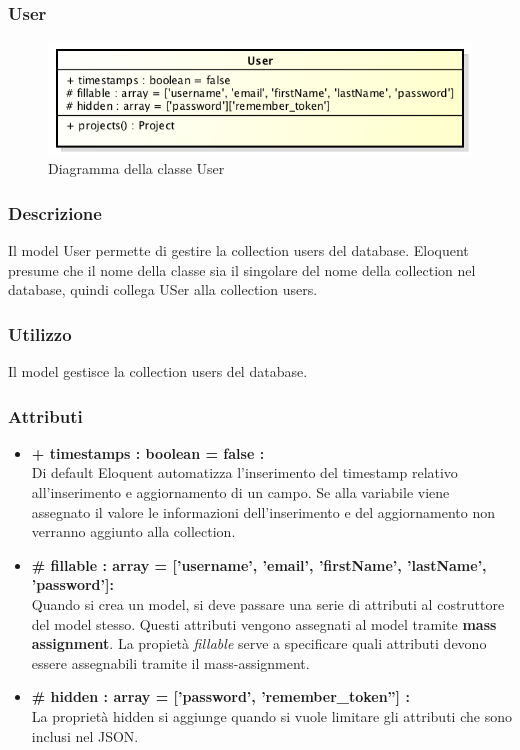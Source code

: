 \newpage
\subsubsection{User}

	\begin{figure}[h]
		\centering
		\includegraphics[width=0.7\linewidth]{img/User}
		\caption[Diagramma della classe User]{Diagramma della classe User}
		\label{fig:User}
	\end{figure}

	\subsubsection*{Descrizione}
	Il model User permette di gestire la collection users del database. Eloquent presume che il nome della classe sia il singolare del nome della collection nel database, quindi collega USer alla collection users.
	\subsubsection*{Utilizzo}
	Il model gestisce la collection users del database.
	\subsubsection*{Attributi}
	\begin{itemize}
		\item \textbf{+ timestamps : boolean = false :}\\
		Di default Eloquent automatizza l'inserimento del timestamp relativo all'inserimento e aggiornamento di un campo. Se alla variabile viene assegnato il valore le informazioni dell'inserimento e del aggiornamento non verranno aggiunto alla collection.
		\item \textbf{\# fillable : array = ['username', 'email', 'firstName', 'lastName', 'password']:}\\
		Quando si crea un model, si deve passare una serie di attributi al costruttore del model stesso. Questi attributi vengono assegnati al model tramite \textbf{mass assignment}. La propietà \textit{fillable} serve a specificare quali attributi devono essere assegnabili tramite il mass-assignment.
		\item \textbf{\# hidden : array = ['password', 'remember\_token''] : }\\
		La proprietà hidden si aggiunge quando si vuole limitare gli attributi che sono inclusi nel JSON.
	\end{itemize}

